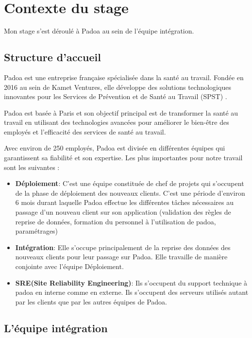 \section{Contexte du stage}
Mon stage s'est déroulé à Padoa au sein de l'équipe intégration.

\subsection{Structure d'accueil}

Padoa est une entreprise française spécialisée dans la santé au travail. Fondée
en 2016 au sein de Kamet Ventures, elle développe des solutions technologiques
innovantes pour les Services de Prévention et de Santé au Travail (SPST)
\cite{padoa-website}.

Padoa est basée à Paris et son objectif principal est de transformer la santé
au travail en utilisant des technologies avancées pour améliorer le bien-être
des employés et l'efficacité des services de santé au travail.

Avec environ de 250 employés, Padoa est divisée en différentes équipes qui
garantissent sa fiabilité et son expertise. Les plus importantes pour notre
travail sont les suivantes :
\begin{itemize}

  \item \textbf{Déploiement}:
        C'est une équipe constituée de chef de projets qui s'occupent de la phase de déploiement des nouveaux clients. C'est une période d'environ 6 mois durant laquelle Padoa effectue les différentes tâches nécessaires au passage d'un nouveau client sur son application (validation des règles de reprise de données, formation du personnel à l'utilisation de padoa, paramétrages)

  \item \textbf{Intégration}:
        Elle s'occupe principalement de la reprise des données des nouveaux clients pour leur passage sur Padoa. Elle travaille de manière conjointe avec l'équipe Déploiement.

  \item \textbf{SRE(Site Reliability Engineering)}:
        Ils s'occupent du support technique à padoa en interne comme en externe. Ils s'occupent des serveurs utilisés autant par les clients que par les autres équipes de Padoa.

\end{itemize}

\subsection{L'équipe intégration}

